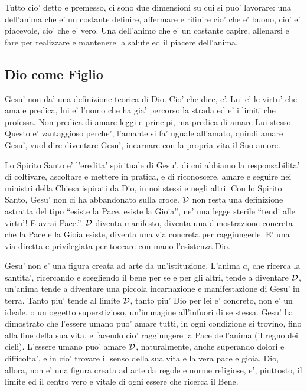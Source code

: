 Tutto cio' detto e premesso, ci sono due dimensioni su cui si puo' lavorare: una dell'anima che e' un costante definire, affermare e rifinire cio' che e' buono, cio' e' piacevole, cio' che e' vero. Una dell'animo che e' un costante capire, allenarsi e fare per realizzare e mantenere la salute ed il piacere dell'anima.


\subsection{Dio come Figlio}
Gesu' non da' una definizione teorica di Dio. Cio' che dice, e'. Lui e' le virtu' che ama e predica, lui e' l'uomo che ha gia' percorso la strada ed e' i limiti che professa. Non predica di amare leggi e principi, ma predica di amare Lui stesso. Questo e' vantaggioso perche', l'amante si fa' uguale all'amato, quindi amare Gesu', vuol dire diventare Gesu', incarnare con la propria vita il Suo amore.

Lo Spirito Santo e' l'eredita' spirituale di Gesu', di cui abbiamo la responsabilita' di coltivare, ascoltare e mettere in pratica, e di riconoscere, amare e seguire nei ministri della Chiesa ispirati da Dio, in noi stessi e negli altri. Con lo Spirito Santo, Gesu' non ci ha abbandonato sulla croce. $\mathcal{D}$ non resta una definizione astratta del tipo ``esiste la Pace, esiste la Gioia'', ne' una legge sterile ``tendi alle virtu'! E avrai Pace.''. $\mathcal{D}$ diventa manifesto, diventa una dimostrazione concreta che la Pace e la Gioia esiste, diventa una via concreta per raggiungerle. E' una via diretta e privilegiata per toccare con mano l'esistenza Dio.

Gesu' non e' una figura creata ad arte da un'istituzione.
L'anima $a_i$ che ricerca la santita', ricercando e scegliendo il bene per se e per gli altri, tende a diventare $\mathcal{D}$, un'anima tende a diventare una piccola incarnazione e manifestazione di Gesu' in terra. Tanto piu' tende al limite $\mathcal{D}$, tanto piu' Dio per lei e' concreto, non e' un ideale, o un oggetto superstizioso, un'immagine all'infuori di se stessa. Gesu' ha dimostrato che l'essere umano puo' amare tutti, in ogni condizione si trovino, fino alla fine della sua vita, e facendo cio' raggiungere la Pace dell'anima (il regno dei cieli). L'essere umano puo' amare $\mathcal{D}$, naturalmente, anche superando dolori e difficolta', e in cio' trovare il senso della sua vita e la vera pace e gioia. Dio, allora, non e' una figura creata ad arte da regole e norme religiose, e', piuttosto, il limite ed il centro vero e vitale di ogni essere che ricerca il Bene. 

